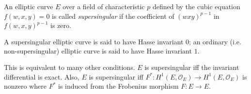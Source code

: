 \documentclass[12pt]{article}
\begin{document}
An elliptic curve $E$ over a field of characteristic $p$ defined by the cubic equation $f(w,x,y) = 0$ is called {\em supersingular}  if the coefficient of $(wxy)^{p-1}$ in $f(w,x,y)^{p-1}$ is zero.

A supersingular elliptic curve is said to have Hasse invariant $0$; an ordinary (i.e. non-supersingular) elliptic curve is said to have Hasse invariant $1$.

This is equivalent to many other conditions.  $E$ is supersingular iff the invariant differential is exact.
Also, $E$ is supersingular iff $F^* : H^1(E,\mathcal{O}_E)\to H^1(E,\mathcal{O}_E)$ is nonzero where $F^*$ is induced from the Frobenius morphism $F : E\to E$.
\end{document}
